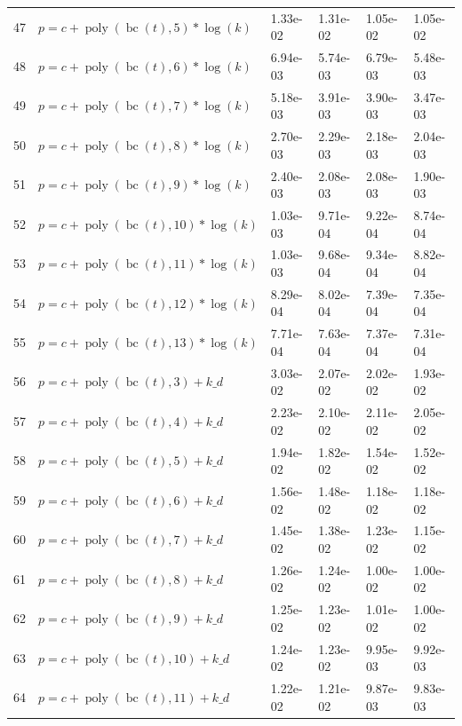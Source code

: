 \documentclass[12pt,a4paper]{article}
\DeclareMathOperator{\bc}{bc}
\DeclareMathOperator{\poly}{poly}
\begin{document}
\begin{longtable}[t]{ll>{\raggedleft\arraybackslash}p{2cm}>{\raggedleft\arraybackslash}p{2cm}>{\raggedleft\arraybackslash}p{2cm}>{\raggedleft\arraybackslash}p{2cm}}
\rowcolor{gray!6}  47 & $p = c + \poly\left( \bc(t), 5 \right) * \log(k)$ & 1.33e-02 & 1.31e-02 & 1.05e-02 & 1.05e-02\\
48 & $p = c + \poly\left( \bc(t), 6 \right) * \log(k)$ & 6.94e-03 & 5.74e-03 & 6.79e-03 & 5.48e-03\\
\rowcolor{gray!6}  49 & $p = c + \poly\left( \bc(t), 7 \right) * \log(k)$ & 5.18e-03 & 3.91e-03 & 3.90e-03 & 3.47e-03\\
50 & $p = c + \poly\left( \bc(t), 8 \right) * \log(k)$ & 2.70e-03 & 2.29e-03 & 2.18e-03 & 2.04e-03\\
\rowcolor{gray!6}  51 & $p = c + \poly\left( \bc(t), 9 \right) * \log(k)$ & 2.40e-03 & 2.08e-03 & 2.08e-03 & 1.90e-03\\
52 & $p = c + \poly\left( \bc(t), 10 \right) * \log(k)$ & 1.03e-03 & 9.71e-04 & 9.22e-04 & 8.74e-04\\
\rowcolor{gray!6}  53 & $p = c + \poly\left( \bc(t), 11 \right) * \log(k)$ & 1.03e-03 & 9.68e-04 & 9.34e-04 & 8.82e-04\\
54 & $p = c + \poly\left( \bc(t), 12 \right) * \log(k)$ & 8.29e-04 & 8.02e-04 & 7.39e-04 & 7.35e-04\\
\rowcolor{gray!6}  55 & $p = c + \poly\left( \bc(t), 13 \right) * \log(k)$ & 7.71e-04 & 7.63e-04 & 7.37e-04 & 7.31e-04\\
56 & $p = c + \poly\left( \bc(t), 3 \right) + k\_d$ & 3.03e-02 & 2.07e-02 & 2.02e-02 & 1.93e-02\\
\rowcolor{gray!6}  57 & $p = c + \poly\left( \bc(t), 4 \right) + k\_d$ & 2.23e-02 & 2.10e-02 & 2.11e-02 & 2.05e-02\\
58 & $p = c + \poly\left( \bc(t), 5 \right) + k\_d$ & 1.94e-02 & 1.82e-02 & 1.54e-02 & 1.52e-02\\
\rowcolor{gray!6}  59 & $p = c + \poly\left( \bc(t), 6 \right) + k\_d$ & 1.56e-02 & 1.48e-02 & 1.18e-02 & 1.18e-02\\
60 & $p = c + \poly\left( \bc(t), 7 \right) + k\_d$ & 1.45e-02 & 1.38e-02 & 1.23e-02 & 1.15e-02\\
\rowcolor{gray!6}  61 & $p = c + \poly\left( \bc(t), 8 \right) + k\_d$ & 1.26e-02 & 1.24e-02 & 1.00e-02 & 1.00e-02\\
62 & $p = c + \poly\left( \bc(t), 9 \right) + k\_d$ & 1.25e-02 & 1.23e-02 & 1.01e-02 & 1.00e-02\\
\rowcolor{gray!6}  63 & $p = c + \poly\left( \bc(t), 10 \right) + k\_d$ & 1.24e-02 & 1.23e-02 & 9.95e-03 & 9.92e-03\\
64 & $p = c + \poly\left( \bc(t), 11 \right) + k\_d$ & 1.22e-02 & 1.21e-02 & 9.87e-03 & 9.83e-03\\

\end{longtable}
\end{document}
